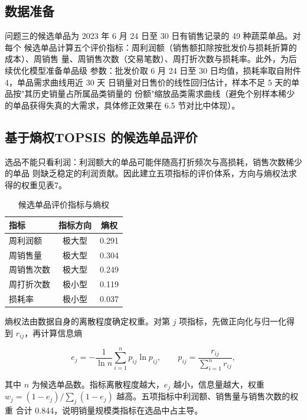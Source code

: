 
\subsection{数据准备}

问题三的候选单品为 2023 年 6 月 24 日至 30 日有销售记录的 49 种蔬菜单品。对每个
候选单品计算五个评价指标：周利润额（销售额扣除按批发价与损耗折算的成本）、周销售
量、周销售次数（交易笔数）、周打折次数与损耗率。此外，为后续优化模型准备单品级
参数：批发价取 6 月 24 日至 30 日均值，损耗率取自附件4，单品需求曲线用近 30 天
日销量对日售价的线性回归估计，样本不足 5 天的单品按"其历史销量占所属品类销量的
份额"缩放品类需求曲线（避免个别样本稀少的单品获得失真的大需求，具体修正效果在
6.5 节对比中体现）。

\subsection{基于熵权TOPSIS 的候选单品评价}

选品不能只看利润：利润额大的单品可能伴随高打折频次与高损耗，销售次数稀少的单品
则缺乏稳定的利润贡献。因此建立五项指标的评价体系，方向与熵权法求得的权重见表7。

\begin{table}[H]
\centering
\caption{候选单品评价指标与熵权}
\label{tab:topsis_ind}
\begin{tabular}{lcc}
\toprule
指标 & 指标方向 & 熵权 \\
\midrule
周利润额 & 极大型 & 0.291 \\
周销售量 & 极大型 & 0.304 \\
周销售次数 & 极大型 & 0.249 \\
周打折次数 & 极小型 & 0.119 \\
损耗率 & 极小型 & 0.037 \\
\bottomrule
\end{tabular}
\end{table}

熵权法由数据自身的离散程度确定权重。对第 $j$ 项指标，先做正向化与归一化得到
$r_{ij}$，再计算信息熵

\begin{equation}
e_j=-\frac{1}{\ln n}\sum_{i=1}^{n}p_{ij}\ln p_{ij},\qquad
p_{ij}=\frac{r_{ij}}{\sum_{i=1}^{n}r_{ij}},
\label{eq:entropy}
\end{equation}

其中 $n$ 为候选单品数。指标离散程度越大，$e_j$ 越小，信息量越大，权重
$w_j=(1-e_j)/\sum_j(1-e_j)$ 越高。五项指标中利润额、销售量与销售次数的权重
合计 0.844，说明销量规模类指标在选品中占主导。


